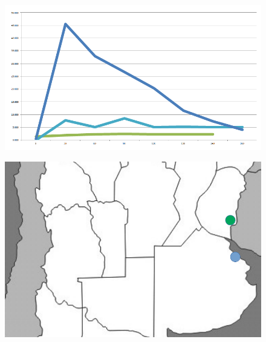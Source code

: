 \documentclass[final]{beamer}
\newlength{\onecolwid}
\begin{document}
\begin{frame}[t]
\begin{columns}[t]
         
         
         
         \begin{column}{\onecolwid} %
         
        
          
          \begin{block}{ }
				\begin{figure}
                	\vspace*{-1cm}
                    \includegraphics[width=.9\linewidth]{plot.PNG}
				\end{figure}
				\begin{figure}
                  \includegraphics[width=.6\linewidth]{ar.png}
				\end{figure}
                

\end{block}
\end{column}
\end{columns}
\end{frame}
\end{document}
